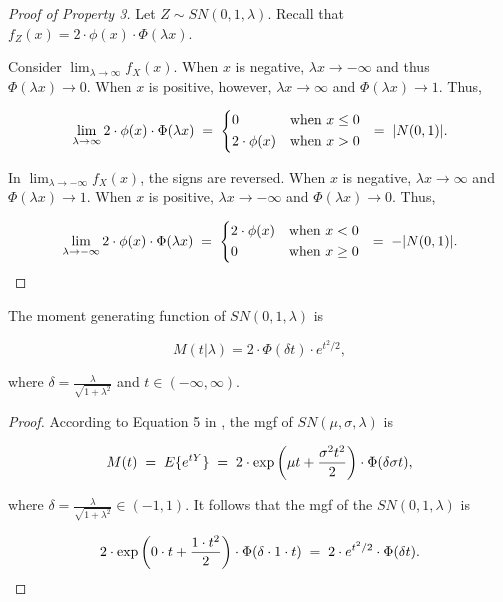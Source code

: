 \documentclass{article}
\begin{document}
\begin{proof}[Proof of Property 3]
  Let $Z \sim SN(0,1,\lambda)$. Recall that $f_Z(x) = 2 \cdot \phi(x) \cdot
  \Phi(\lambda x)$.

  Consider $\lim_{\lambda \to \infty} f_X(x)$. When $x$ is negative, $\lambda x
  \to -\infty$ and thus $\Phi(\lambda x) \to 0$. When $x$ is positive, however,
  $\lambda x \to \infty$ and $\Phi(\lambda x) \to 1$. Thus,

  \begin{equation}
    \label{eq:p2-positive-half-normal}
    \lim_{\lambda \to \infty} 2 \cdot \phi(x) \cdot \Phi(\lambda x) \eq
    \begin{dcases*}
      0 & when $x \leq 0$ \\
      2 \cdot \phi(x) & when $x > 0$
    \end{dcases*}
    \eq |N(0,1)|.
  \end{equation}

  In $\lim_{\lambda \to -\infty} f_X(x)$, the signs are reversed. When $x$ is
  negative, $\lambda x \to \infty$ and $\Phi(\lambda x) \to 1$. When $x$ is
  positive, $\lambda x \to -\infty$ and $\Phi(\lambda x) \to 0$. Thus,

  \begin{equation}
    \label{eq:p2-negative-half-normal}
    \lim_{\lambda \to -\infty} 2 \cdot \phi(x) \cdot \Phi(\lambda x) \eq
    \begin{dcases*}
      2 \cdot \phi(x) & when $x < 0$ \\
      0 & when $x \geq 0$
    \end{dcases*}
    \eq -|N(0,1)|.
  \end{equation}
\end{proof}


\begin{property} \label{prop:4}
  The moment generating function of $SN(0,1,\lambda)$ is

  \begin{equation} \label{eq:p4-sn-mgf}
    M(t|\lambda) = 2 \cdot \Phi (\delta t) \cdot e^{t^2/2},
  \end{equation}
    
  where $\delta = \frac{\lambda}{\sqrt{1 + \lambda^2}}$ and $t \in (-\infty, \infty)$.
\end{property}

\begin{proof}
  According to Equation 5 in \citet{azzalini}, the mgf of $SN(\mu, \sigma,
  \lambda)$ is

  \begin{equation*}
    M(t) \;=\; E\{e^{tY}\} \;=\; 2 \cdot \exp \left( \mu t + \frac{\sigma^2 t^2}{2} \right) \cdot \Phi(\delta \sigma t),
  \end{equation*}

  where $\delta = \frac{\lambda}{\sqrt{1 + \lambda^2}} \in (-1, 1)$. It follows
  that the mgf of the $SN(0, 1, \lambda)$ is

  \begin{equation*}
    2 \cdot \exp \left( 0 \cdot t + \frac{1 \cdot t^2}{2} \right) \cdot \Phi(\delta \cdot 1 \cdot t) \;=\; 2 \cdot e^{t^2/2} \cdot \Phi(\delta t).
  \end{equation*}
\end{proof}
\end{document}
